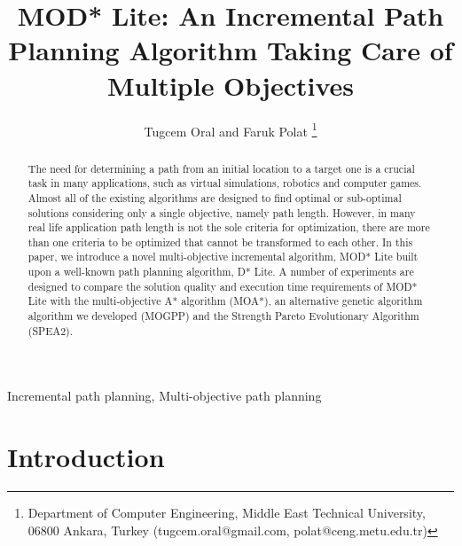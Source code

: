 \documentclass[10pt,journal]{IEEEtran}
\begin{document}
\title{MOD* Lite: An Incremental Path Planning Algorithm Taking Care of Multiple Objectives}

\author{Tugcem Oral and Faruk Polat
\thanks{Department of Computer Engineering, Middle East Technical University, 06800 Ankara, Turkey (tugcem.oral@gmail.com, polat@ceng.metu.edu.tr)}}

\maketitle

\begin{abstract}
The need for determining a path from an initial location to a target one is a crucial task in many applications, such as virtual simulations, robotics and computer games. Almost all of the existing algorithms are designed to find optimal or sub-optimal solutions considering only a single objective, namely path length.  However, in many real life application path length is not the sole criteria for optimization, there are more than one criteria to be optimized that cannot be transformed to each other. In this paper, we introduce  a novel multi-objective incremental algorithm, MOD* Lite built upon a well-known path planning algorithm, D* Lite. A number of experiments are designed to compare the solution quality and execution time requirements of MOD* Lite with the multi-objective A* algorithm (MOA*), an alternative genetic algorithm algorithm we developed (MOGPP) and the Strength Pareto Evolutionary Algorithm (SPEA2).
\end{abstract}

\begin{IEEEkeywords}
Incremental path planning, Multi-objective path planning
\end{IEEEkeywords}

\section{Introduction}
\label{chapter:introduction}
\end{document}

